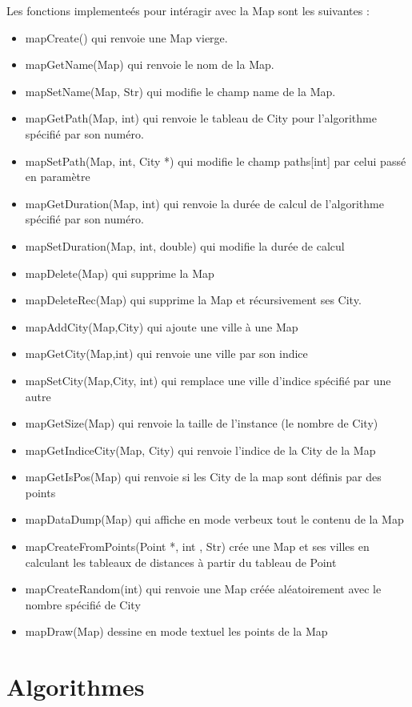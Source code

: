 \documentclass[12pt]{report}
\begin{document}
Les fonctions implementeés pour intéragir avec la Map sont les suivantes  :
\begin{itemize}
	\item mapCreate() qui renvoie une Map vierge.
    \item mapGetName(Map) qui renvoie le nom de la Map.
    \item mapSetName(Map, Str) qui modifie le champ name de la Map.
    \item mapGetPath(Map, int) qui renvoie le tableau de City pour l'algorithme spécifié par son numéro.
    \item mapSetPath(Map, int, City *) qui modifie le champ paths[int] par celui passé en paramètre
    \item mapGetDuration(Map, int) qui renvoie la durée de calcul de l'algorithme spécifié par son numéro.
    \item mapSetDuration(Map, int, double) qui modifie la durée de calcul
    \item mapDelete(Map) qui supprime la Map
    \item mapDeleteRec(Map) qui supprime la Map et récursivement ses City.
    \item mapAddCity(Map,City) qui ajoute une ville à une Map
    \item mapGetCity(Map,int) qui renvoie une ville par son indice
    \item mapSetCity(Map,City, int) qui remplace une ville d'indice spécifié par une autre 
    \item mapGetSize(Map) qui renvoie la taille de l'instance (le nombre de City)
    \item mapGetIndiceCity(Map, City) qui renvoie l'indice de la City de la Map
    \item mapGetIsPos(Map) qui renvoie si les City de la map sont définis par des points
    \item mapDataDump(Map) qui affiche en mode verbeux tout le contenu de la Map
    \item mapCreateFromPoints(Point *, int , Str) crée une Map et ses villes en calculant les tableaux de distances à partir du tableau de Point
    \item mapCreateRandom(int) qui renvoie une Map créée aléatoirement avec le nombre spécifié de City
    \item  mapDraw(Map) dessine en mode textuel les points de la Map
\end{itemize}


\section{Algorithmes}
\end{document}
